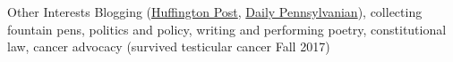 \documentclass{resume} %
\begin{document}
%
\begin{rSection}{Other Interests} %
  Blogging (\href{https://www.huffingtonpost.com/author/theodore-caputi}{Huffington Post}, \href{https://www.thedp.com/staff/theodore-l-caputi}{Daily Pennsylvanian}), collecting fountain pens, politics and policy, writing and performing poetry, constitutional law, cancer advocacy (survived testicular cancer Fall 2017)
\end{rSection}
\end{document}
